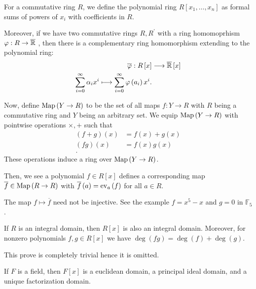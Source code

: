 \begin{recall}
	For a commutative ring \(R\), we define the polynomial ring \(R\left[ x_1, \ldots, x_{n} \right] \) as formal sums of powers of \(x_{i}\) with coefficients in \(R\).
\end{recall}
Moreover, if we have two commutative rings \(R, R^{\prime}\) with a ring homomoprhism \(\varphi: R \to \overline{\mathbb{R}}\) , then there is a complementary ring homomorphism extending to the polynomial ring: \begin{align*}
	\overline{\varphi}:  R\left[ x \right] &\longrightarrow \overline{\mathbb{R}}\left[ x \right]  \\
	 \sum_{i=0}^{\infty} \alpha_{i}x^{i} \longmapsto \sum_{i=0}^{\infty} \varphi\left( a_{i} \right) x^{i}
.\end{align*}
\begin{definition}
	Now, define \(\operatorname{Map}\left( Y \to R \right) \) to be the set of all maps \(f : Y \to R\) with \(R\) being a commutative ring and \(Y\) being an arbitrary set. We equip \(\operatorname{Map}\left( Y\to R \right) \) with pointwise operations \(\times, +\) such that
	\begin{align*}
		\left( f+g \right) \left( x \right) &= f\left( x \right) + g\left( x \right)   \\
		\left( fg \right) \left( x \right) &=  f\left( x \right) g\left( x \right)   \\
	.\end{align*}
	These operations induce a ring over \(\operatorname{Map} \left( Y\to R \right) \).
\end{definition}
Then, we see a polynomial \(f \in R\left[ x \right] \) defines a corresponding map \(\overline{f} \in \operatorname{Map}\left( R\to R \right) \) with \(\overline{f}\left( a \right) = \operatorname{ev}_{a}\left( f \right)  \) for all \(a \in R\).\\
\begin{remark}
	The map \(f \mapsto \overline{f}\) need not be injective. See the example \(f = x^{5} - x\) and \(g = 0\) in \(\mathbb{F}_{5}\).
\end{remark}
\begin{proposition}
	If \(R\) is an integral domain, then \(R\left[ x \right] \) is also an integral domain. Moreover, for nonzero polynomials \(f, g \in R\left[ x \right] \) we have \(\deg \left( fg \right) = \deg \left( f \right)  + \deg \left( g \right) \).
\end{proposition}
This prove is completely trivial hence it is omitted.
\begin{theorem}
	If \(F\) is a field, then \(F\left[ x \right] \) is a euclidean domain, a principal ideal domain, and a unique factorization domain.
\end{theorem}
